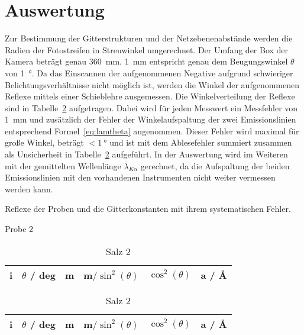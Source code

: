 \section{Auswertung}\label{sec:Auswertung}

Zur Bestimmung der Gitterstrukturen und der Netzebenenabstände werden die
Radien der Fotostreifen in Streuwinkel umgerechnet.
Der Umfang der Box der Kamera beträgt genau \SI{360}{\milli\meter}.
\SI{1}{\milli\meter} entspricht genau dem Beugungswinkel $\theta$ von
\SI{1}{\degree}.
Da das Einscannen der aufgenommenen Negative aufgrund schwieriger
Belichtungsverhältnisse nicht möglich ist, werden die Winkel der aufgenommenen
Reflexe mittels einer Schieblehre ausgemessen.
Die Winkelverteilung der Reflexe sind in Tabelle~\ref{tab:wink} aufgetragen.
Dabei wird für jeden Messwert ein Messfehler von \SI{1}{\milli\meter} und
zusätzlich der Fehler der Winkelaufspaltung der zwei Emissionslinien
entsprechend Formel~\eqref{eq:lamtheta} angenommen.
Dieser Fehler wird maximal für große Winkel, beträgt $< \SI{1}{\degree}$ und ist mit dem
Ablesefehler summiert zusammen als Unsicherheit in Tabelle~\ref{tab:wink}
aufgeführt.
In der Auswertung wird im Weiteren mit der gemittelten Wellenlänge
$\overline{\lambda}_{K\alpha}$ gerechnet, da die Aufspaltung der beiden Emissionslinien 
mit den vorhandenen Instrumenten nicht weiter vermessen werden kann.

\begin{table}[ht]
		\centering
		\caption{Reflexe der Proben und die Gitterkonstanten mit ihrem
		systematischen Fehler.}
		\label{tab:wink}
		\begin{subtable}{\textwidth}
				\centering
				\caption{Probe 2}
				\begin{tabular}{c c c c c c}
						\toprule
						i & $\theta$ / deg & m & m$/\sin^2(\theta)$ & $\cos^2(\theta)$
						  & a / \AA \\ \midrule
						
						\bottomrule
				\end{tabular}
		\end{subtable}
		\begin{subtable}{\textwidth}
				\centering
				\caption{Salz 2}
				\begin{tabular}{c c c c c c}
						\toprule
						i & $\theta$ / deg & m & m$/\sin^2(\theta)$ & $\cos^2(\theta)$
						  & a / \AA \\ 
						\midrule
						
						\bottomrule
				\end{tabular}
		\end{subtable}
\end{table}

